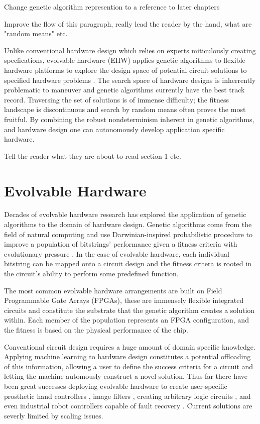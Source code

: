 \todo Change genetic algorithm represention to a reference to later chapters

\todo Improve the flow of this paragraph, really lead the reader by the hand,
what are "random means" etc.

Unlike conventional hardware design which relies on experts miticulously creating
specfications, evolvable hardware (EHW) applies genetic algorithms to
flexible hardware platforms to explore the design space of potential
circuit solutions to specified hardware problems \cite{541893}.
The search space of hardware designs is inherrently problematic to maneuver and
genetic algorithms currently have the best track record.
Traversing the set of solutions is of immense difficulty; the fitness landscape
is discontinuous and
search by random means often proves the most fruitful. By combining
the robust nondeterminism inherent in genetic algorithms, and hardware design
one can autonomously develop application specific hardware.

\todo Tell the reader what they are about to read section 1 etc.

\section{Evolvable Hardware}
Decades of evolvable hardware research has explored the application of genetic algorithms to
the domain of hardware design. Genetic algorithms come from the field of natural
computing and use Darwinian-inspired probabilistic procedure to improve a population
of bitstrings'
performance given a fitness criteria with evolutionary pressure \cite{Goldberg:1989:GAS:534133}.
In the case of evolvable hardware,
each individual bitstring can be mapped onto a circuit design
and the fitness critera is rooted
in the circuit's ability to perform some predefined function.

The most common evolvable hardware arrangements
are built on Field Programmable Gate Arrays (FPGAs), these are immensely
flexible integrated circuits and constitute the substrate that the genetic
algorithm creates a solution within. Each member of the population
represents an FPGA configuration, and the fitness is based on the
physical performance of the chip.

Conventional circuit design requires a huge amount of domain specific knowledge.
Applying machine learning to hardware design constitutes a potential
offloading of this information, allowing a user to define the success
criteria for a circuit and letting the machine automously construct a novel solution.
Thus far there have been great successes deploying evolvable hardware to
create user-specific prosthetic hand controllers \cite{Kajitani1999AnEH},
image filters \cite{HybridFilter}, creating arbitrary logic circuits
\cite{Vasicek2011}, and even industrial robot controllers capable of fault recovery \cite{10.1007/3-540-61093-6_6}.
Current solutions are severly limited by scaling issues.

